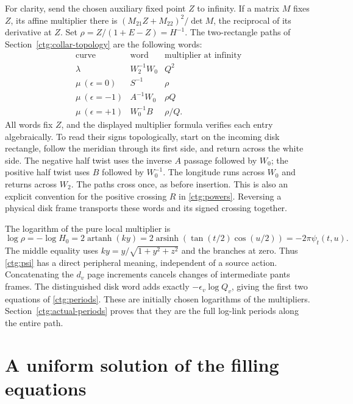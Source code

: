 \documentclass[11pt]{article}
\numberwithin{equation}{section}
\theoremstyle{definition}
\theoremstyle{remark}
\newcommand{\arsinh}{\operatorname{arsinh}}
\newcommand{\artanh}{\operatorname{artanh}}
\begin{document}
For clarity, send the chosen auxiliary fixed point $Z$ to infinity. If a matrix
$M$ fixes $Z$, its affine multiplier there is
$(M_{21}Z+M_{22})^2/\det M$, the reciprocal of its derivative at $Z$.
Set $\rho=Z/(1+E-Z)=H^{-1}$. The two-rectangle paths of
Section~\ref{ctg:collar-topology} are the following words:
\begin{equation}\label{ctg:primitive-words}
\begin{array}{c|c|c}
 \text{curve}&\text{word}&\text{multiplier at infinity}\\\hline
 \lambda&W_2^{-1}W_0&Q^2\\
 \mu\ (\epsilon=0)&S^{-1}&\rho\\
 \mu\ (\epsilon=-1)&A^{-1}W_0&\rho Q\\
 \mu\ (\epsilon=+1)&W_0^{-1}B&\rho/Q.
\end{array}
\end{equation}
All words fix $Z$, and the displayed multiplier formula verifies each
entry algebraically. To read their signs topologically, start on the
incoming disk rectangle, follow the meridian through its first side,
and return across the white side. The negative half twist uses the
inverse $A$ passage followed by $W_0$; the positive half twist uses
$B$ followed by $W_0^{-1}$. The longitude runs across $W_0$ and
returns across $W_2$. The paths cross once, as before insertion.
This is also an explicit convention for the positive crossing $R$ in
\eqref{ctg:powers}. Reversing a physical disk frame transports these
words and its signed crossing together.

The logarithm of the pure local multiplier is
\begin{equation}\label{ctg:increment}
 \log\rho=-\log H_0
 =2\artanh(ky)
 =2\arsinh\!\left(\tan(t/2)\cos(u/2)\right)
 =-2\pi\psi_t(t,u).
\end{equation}
The middle equality uses
$ky=y/\sqrt{1+y^2+z^2}$ and the branches at zero.
Thus \eqref{ctg:psi} has a direct peripheral meaning, independent of
a source action. Concatenating the $d_v$ page increments cancels
changes of intermediate pants frames. The distinguished disk word
adds exactly $-\epsilon_v\log Q_v$, giving the first two equations
of \eqref{ctg:periods}. These are initially chosen logarithms of the
multipliers. Section~\ref{ctg:actual-periods} proves that they
are the full log-link periods along the entire path.

\section{A uniform solution of the filling equations}
\label{ctg:contraction}
\end{document}
